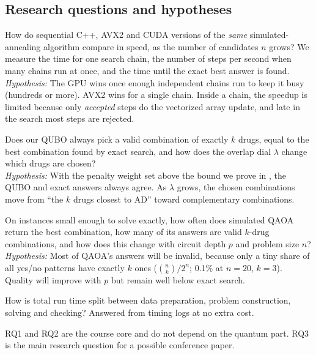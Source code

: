 \subsection{Research questions and hypotheses}

\begin{description}[leftmargin=0.8cm,style=nextline]
\item[RQ1 (main): How much do SIMD and the GPU help?] How do sequential C++, AVX2 and CUDA versions of the \emph{same} simulated-annealing algorithm compare in speed, as the number of candidates $n$ grows? We measure the time for one search chain, the number of steps per second when many chains run at once, and the time until the exact best answer is found.\\
\emph{Hypothesis:} The GPU wins once enough independent chains run to keep it busy (hundreds or more). AVX2 wins for a single chain. Inside a chain, the speedup is limited because only \emph{accepted} steps do the vectorized array update, and late in the search most steps are rejected.
\item[RQ2 (main): Is the scoring function right?] Does our QUBO always pick a valid combination of exactly $k$ drugs, equal to the best combination found by exact search, and how does the overlap dial $\lambda$ change which drugs are chosen?\\
\emph{Hypothesis:} With the penalty weight set above the bound we prove in , the QUBO and exact answers always agree. As $\lambda$ grows, the chosen combinations move from ``the $k$ drugs closest to AD'' toward complementary combinations.
\item[RQ3 (extension): How good is QAOA?] On instances small enough to solve exactly, how often does simulated QAOA return the best combination, how many of its answers are valid $k$-drug combinations, and how does this change with circuit depth $p$ and problem size $n$?\\
\emph{Hypothesis:} Most of QAOA's answers will be invalid, because only a tiny share of all yes/no patterns have exactly $k$ ones ($\binom{n}{k}/2^n$; 0.1\% at $n=20$, $k=3$). Quality will improve with $p$ but remain well below exact search.
\item[RQ4 (supporting): Where does the time go?] How is total run time split between data preparation, problem construction, solving and checking? Answered from timing logs at no extra cost.
\end{description}

RQ1 and RQ2 are the course core and do not depend on the quantum part. RQ3 is the main research question for a possible conference paper.

